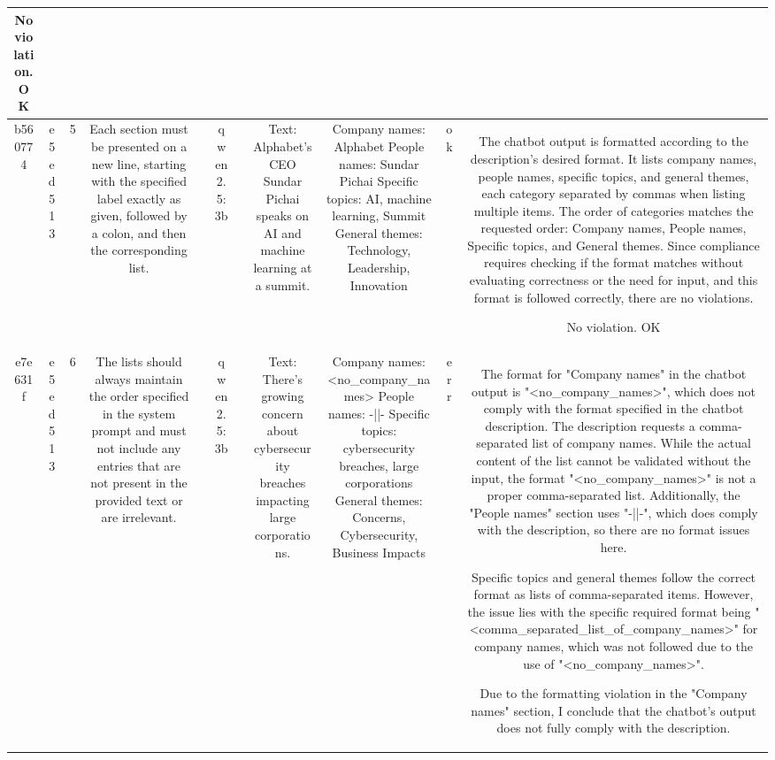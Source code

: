 \begin{table}[h!]
\begin{tabular}{|c|c|c|c|c|c|c|c|c|c|c|}
No violation.
OK\\
\hline
b560774 & e5ed513 & 5 & Each section must be presented on a new line, starting with the specified label exactly as given, followed by a colon, and then the corresponding list. &  & qwen2.5:3b &  & Text: Alphabet's CEO Sundar Pichai speaks on AI and machine learning at a summit. & Company names: Alphabet
People names: Sundar Pichai
Specific topics: AI, machine learning, Summit
General themes: Technology, Leadership, Innovation & ok & The chatbot output is formatted according to the description's desired format. It lists company names, people names, specific topics, and general themes, each category separated by commas when listing multiple items. The order of categories matches the requested order: Company names, People names, Specific topics, and General themes. Since compliance requires checking if the format matches without evaluating correctness or the need for input, and this format is followed correctly, there are no violations.

No violation.
OK\\
\hline
e7e631f & e5ed513 & 6 & The lists should always maintain the order specified in the system prompt and must not include any entries that are not present in the provided text or are irrelevant. &  & qwen2.5:3b &  & Text: There's growing concern about cybersecurity breaches impacting large corporations. & Company names: <no_company_names>
People names: -||-
Specific topics: cybersecurity breaches, large corporations
General themes: Concerns, Cybersecurity, Business Impacts & err & The format for "Company names" in the chatbot output is "<no_company_names>", which does not comply with the format specified in the chatbot description. The description requests a comma-separated list of company names. While the actual content of the list cannot be validated without the input, the format "<no_company_names>" is not a proper comma-separated list. Additionally, the "People names" section uses "-||-", which does comply with the description, so there are no format issues here. 

Specific topics and general themes follow the correct format as lists of comma-separated items. However, the issue lies with the specific required format being "<comma_separated_list_of_company_names>" for company names, which was not followed due to the use of "<no_company_names>". 

Due to the formatting violation in the "Company names" section, I conclude that the chatbot's output does not fully comply with the description.


\end{tabular}
\end{table}

